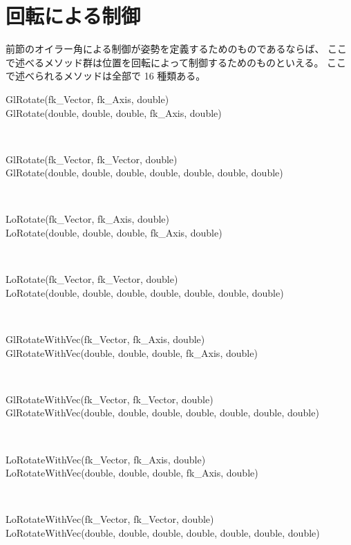 \section{回転による制御}
前節のオイラー角による制御が姿勢を定義するためのものであるならば、
ここで述べるメソッド群は位置を回転によって制御するためのものといえる。
ここで述べられるメソッドは全部で 16 種類ある。
\begin{description}
\item[GlRotate(fk\_Vector, fk\_Axis, double)]
\item[GlRotate(double, double, double, fk\_Axis, double)] ~ \\

\item[GlRotate(fk\_Vector, fk\_Vector, double)]
\item[GlRotate(double, double, double, double, double, double, double)] ~ \\

\item[LoRotate(fk\_Vector, fk\_Axis, double)]
\item[LoRotate(double, double, double, fk\_Axis, double)] ~ \\

\item[LoRotate(fk\_Vector, fk\_Vector, double)]
\item[LoRotate(double, double, double, double, double, double, double)] ~ \\

\item[GlRotateWithVec(fk\_Vector, fk\_Axis, double)]
\item[GlRotateWithVec(double, double, double, fk\_Axis, double)] ~ \\

\item[GlRotateWithVec(fk\_Vector, fk\_Vector, double)]
\item[GlRotateWithVec(double, double, double, double, double, double, double)] ~ \\

\item[LoRotateWithVec(fk\_Vector, fk\_Axis, double)]
\item[LoRotateWithVec(double, double, double, fk\_Axis, double)] ~ \\

\item[LoRotateWithVec(fk\_Vector, fk\_Vector, double)]
\item[LoRotateWithVec(double, double, double, double, double, double, double)]
\end{description}

